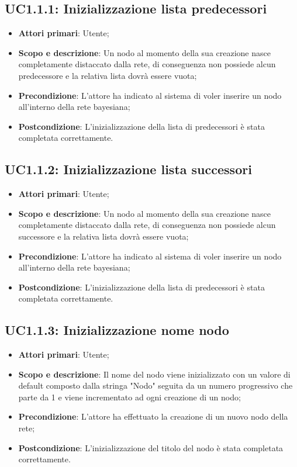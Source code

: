 \subsection{UC1.1.1: Inizializzazione lista predecessori} 
\begin{itemize} 
	\item{\textbf{Attori primari}: Utente;} 
	\item{\textbf{Scopo e descrizione}: Un nodo al momento della sua creazione nasce completamente distaccato dalla rete, di conseguenza non possiede alcun predecessore e la relativa lista dovrà essere vuota;} 
	\item{\textbf{Precondizione}: L'attore ha indicato al sistema di voler inserire un nodo all'interno della rete bayesiana;} 
	\item{\textbf{Postcondizione}: L'inizializzazione della lista di predecessori è stata completata correttamente.} 
\end{itemize} 
\subsection{UC1.1.2: Inizializzazione lista successori} 
\begin{itemize} 
	\item{\textbf{Attori primari}: Utente;} 
	\item{\textbf{Scopo e descrizione}: Un nodo al momento della sua creazione nasce completamente distaccato dalla rete, di conseguenza non possiede alcun successore e la relativa lista dovrà essere vuota;} 
	\item{\textbf{Precondizione}: L'attore ha indicato al sistema di voler inserire un nodo all'interno della rete bayesiana;} 
	\item{\textbf{Postcondizione}: L'inizializzazione della lista di predecessori è stata completata correttamente.} 
\end{itemize} 
\subsection{UC1.1.3: Inizializzazione nome nodo} 
\begin{itemize} 
	\item{\textbf{Attori primari}: Utente;} 
	\item{\textbf{Scopo e descrizione}: Il nome del nodo viene inizializzato con un valore di default composto dalla stringa "Nodo" seguita da un numero progressivo che parte da 1 e viene incrementato ad ogni creazione di un nodo;} 
	\item{\textbf{Precondizione}: L'attore ha effettuato la creazione di un nuovo nodo della rete;} 
	\item{\textbf{Postcondizione}: L'inizializzazione del titolo del nodo è stata completata correttamente.} 
\end{itemize} 

